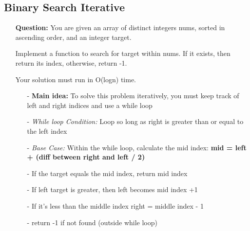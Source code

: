\documentclass[12pt]{article}
\begin{document}
\subsection{Binary Search Iterative}
\begin{enumerate}
  \item[] \textbf{Question:}  You are given an array of distinct integers nums, sorted in ascending order, and an integer target.

Implement a function to search for target within nums. If it exists, then return its index, otherwise, return -1.

Your solution must run in O(logn) time.

    \begin{enumerate}
      \item[-] \textbf{Main idea:} To solve this problem iteratively, you must keep track of left and right indices and use a while loop
      \item[-] \textit{While loop Condition:} Loop so long as right is greater than or equal to the left index 
      \item[-] \textit{Base Case: } Within the while loop, calculate the mid index: \textbf{ mid = left + (diff between right and left / 2)}
      \item[-] If the target equals the mid index, return mid index
      \item[-] If left target is greater, then left becomes mid index +1
      \item[-] If it's less than the middle index right = middle index - 1
      \item[-] return -1 if not found (outside while loop)


    \end{enumerate}
\end{enumerate}
\end{document}
